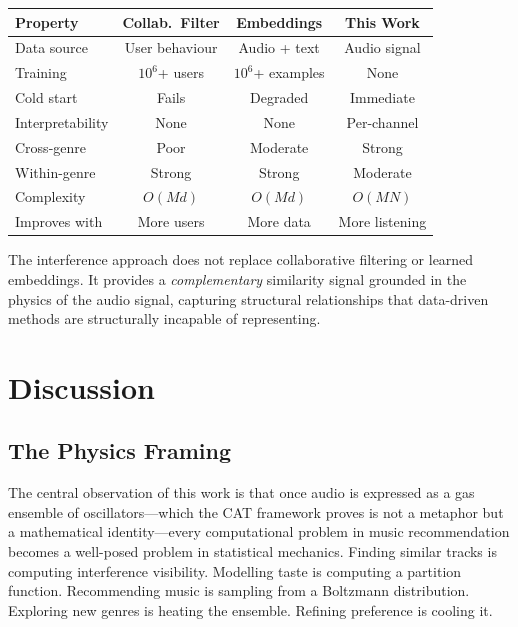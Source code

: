 \documentclass[11pt,twocolumn,a4paper]{article}
\begin{document}
\begin{center}
\begin{tabular}{@{}p{2.3cm}ccc@{}}
\toprule
\textbf{Property} & \textbf{Collab.\ Filter} & \textbf{Embeddings}
  & \textbf{This Work} \\
\midrule
Data source & User behaviour & Audio + text & Audio signal \\
Training & $10^6$+ users & $10^6$+ examples & None \\
Cold start & Fails & Degraded & Immediate \\
Interpretability & None & None & Per-channel \\
Cross-genre & Poor & Moderate & Strong \\
Within-genre & Strong & Strong & Moderate \\
Complexity & $O(Md)$ & $O(Md)$ & $O(MN)$ \\
Improves with & More users & More data & More listening \\
\bottomrule
\end{tabular}
\end{center}

The interference approach does not replace collaborative filtering or
learned embeddings. It provides a \emph{complementary} similarity
signal grounded in the physics of the audio signal, capturing
structural relationships that data-driven methods are structurally
incapable of representing.


\section{Discussion}
\label{sec:discussion}

\subsection{The Physics Framing}

The central observation of this work is that once audio is expressed
as a gas ensemble of oscillators---which the CAT framework proves is
not a metaphor but a mathematical identity---every computational
problem in music recommendation becomes a well-posed problem in
statistical mechanics. Finding similar tracks is computing interference
visibility. Modelling taste is computing a partition function.
Recommending music is sampling from a Boltzmann distribution. Exploring
new genres is heating the ensemble. Refining preference is cooling it.
\end{document}
